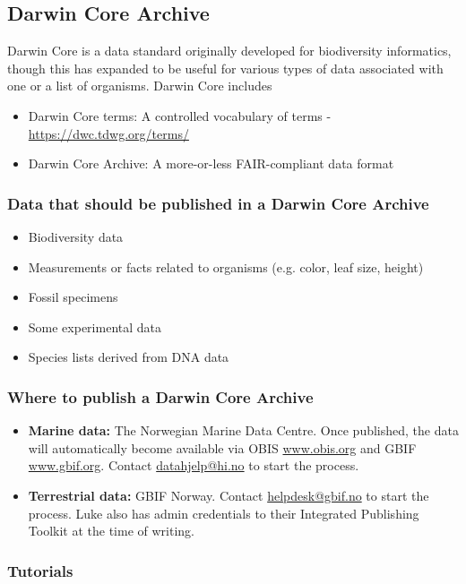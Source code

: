 \documentclass[a4paper,12pt]{article}
\begin{document}
\subsection{Darwin Core Archive}

Darwin Core is a data standard originally developed for biodiversity informatics, though this has expanded to be useful for various types of data associated with one or a list of organisms. Darwin Core includes
\begin{itemize}
\item Darwin Core terms: A controlled vocabulary of terms - \url{https://dwc.tdwg.org/terms/}
\item Darwin Core Archive: A more-or-less FAIR-compliant data format
\end{itemize}

\subsubsection{Data that should be published in a Darwin Core Archive}
\begin{itemize}
\item{Biodiversity data}
\item{Measurements or facts related to organisms (e.g. color, leaf size, height)}
\item{Fossil specimens}
\item{Some experimental data}
\item{Species lists derived from DNA data}
\end{itemize}

\subsubsection{Where to publish a Darwin Core Archive}

\begin{itemize}
\item \textbf{Marine data:} The Norwegian Marine Data Centre. Once published, the data will automatically become available via OBIS \url{www.obis.org} and GBIF \url{www.gbif.org}. Contact \href{mailto:datahjelp@hi.no}{datahjelp@hi.no} to start the process.
\item \textbf{Terrestrial data: } GBIF Norway. Contact \href{mailto:helpdesk@gbif.no}{helpdesk@gbif.no} to start the process. Luke also has admin credentials to their Integrated Publishing Toolkit at the time of writing. 
\end{itemize}

\subsubsection{Tutorials}
 
\end{document}
